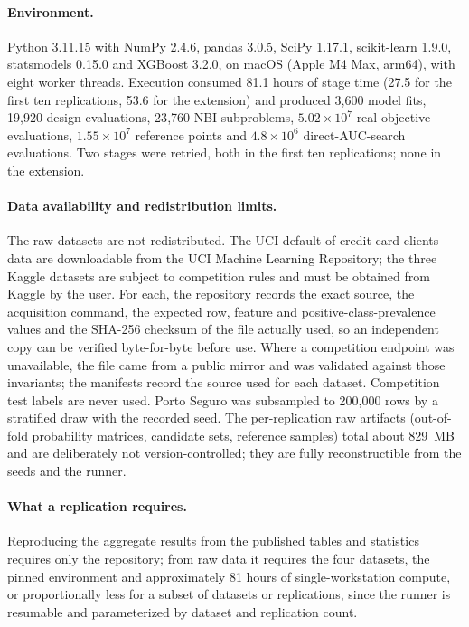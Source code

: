 \paragraph{Environment.} Python 3.11.15 with NumPy 2.4.6, pandas 3.0.5, SciPy 1.17.1, scikit-learn 1.9.0, statsmodels
0.15.0 and XGBoost 3.2.0, on macOS (Apple M4 Max, arm64), with eight worker threads. Execution consumed 81.1 hours of
stage time (27.5 for the first ten replications, 53.6 for the extension) and produced 3{,}600 model fits, 19{,}920
design evaluations, 23{,}760 NBI subproblems, $5.02\times10^{7}$ real objective evaluations, $1.55\times10^{7}$
reference points and $4.8\times10^{6}$ direct-AUC-search evaluations. Two stages were retried, both in the first ten
replications; none in the extension.

\paragraph{Data availability and redistribution limits.} The raw datasets are not redistributed. The UCI
default-of-credit-card-clients data are downloadable from the UCI Machine Learning Repository; the three Kaggle
datasets are subject to competition rules and must be obtained from Kaggle by the user. For each, the repository
records the exact source, the acquisition command, the expected row, feature and positive-class-prevalence values and
the SHA-256 checksum of the file actually used, so an independent copy can be verified byte-for-byte before use. Where
a competition endpoint was unavailable, the file came from a public mirror and was validated against those invariants;
the manifests record the source used for each dataset. Competition test labels are never used. Porto Seguro was
subsampled to 200{,}000 rows by a stratified draw with the recorded seed. The per-replication raw artifacts
(out-of-fold probability matrices, candidate sets, reference samples) total about 829~MB and are deliberately not
version-controlled; they are fully reconstructible from the seeds and the runner.

\paragraph{What a replication requires.} Reproducing the aggregate results from the published tables and statistics
requires only the repository; from raw data it requires the four datasets, the pinned environment and approximately 81
hours of single-workstation compute, or proportionally less for a subset of datasets or replications, since the
runner is resumable and parameterized by dataset and replication count.
